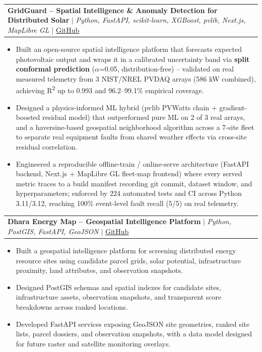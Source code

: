\documentclass[letterpaper,11pt]{article}
\makeatletter
\newcommand{\resumeItem}[1]{
  \item\small{
    {#1 \vspace{-2pt}}
  }
}
\newcommand{\resumeProjectHeading}[2]{
    \item
    \begin{tabular*}{1.001\textwidth}{l@{\extracolsep{\fill}}r}
      \small#1 & \textbf{\small #2}\\
    \end{tabular*}\vspace{-7pt}
}
\newcommand{\resumeItemListStart}{\begin{itemize}}
\newcommand{\resumeItemListEnd}{\end{itemize}\vspace{-5pt}}
\makeatother
\begin{document}
      \resumeProjectHeading
          {\textbf{GridGuard -- Spatial Intelligence \& Anomaly Detection for Distributed Solar} $|$ \emph{Python, FastAPI, scikit-learn, XGBoost, pvlib, Next.js, MapLibre GL} $|$ \href{https://github.com/pranavdamera/gridguard}{\underline{GitHub}}}{}
          \resumeItemListStart
            \resumeItem{Built an open-source spatial intelligence platform that forecasts expected photovoltaic output and wraps it in a calibrated uncertainty band via \textbf{split conformal prediction} ($\alpha$=0.05, distribution-free) -- validated on real measured telemetry from 3 NIST/NREL PVDAQ arrays (586 kW combined), achieving R\textsuperscript{2} up to 0.993 and 96.2--99.1\% empirical coverage.}
            \resumeItem{Designed a physics-informed ML hybrid (pvlib PVWatts chain + gradient-boosted residual model) that outperformed pure ML on 2 of 3 real arrays, and a haversine-based geospatial neighborhood algorithm across a 7-site fleet to separate real equipment faults from shared weather effects via cross-site residual correlation.}
            \resumeItem{Engineered a reproducible offline-train / online-serve architecture (FastAPI backend, Next.js + MapLibre GL fleet-map frontend) where every served metric traces to a build manifest recording git commit, dataset window, and hyperparameters; enforced by 224 automated tests and CI across Python 3.11/3.12, reaching 100\% event-level fault recall (5/5) on real telemetry.}
          \resumeItemListEnd
          \vspace{-13pt}

      \resumeProjectHeading
          {\textbf{Dhara Energy Map -- Geospatial Intelligence Platform} $|$ \emph{Python, PostGIS, FastAPI, GeoJSON} $|$ \href{https://github.com/pranavdamera/dhara-energy-map}{\underline{GitHub}}}{}
          \resumeItemListStart
            \resumeItem{Built a geospatial intelligence platform for screening distributed energy resource sites using candidate parcel grids, solar potential, infrastructure proximity, land attributes, and observation snapshots.}
            \resumeItem{Designed PostGIS schemas and spatial indexes for candidate sites, infrastructure assets, observation snapshots, and transparent score breakdowns across ranked locations.}
            \resumeItem{Developed FastAPI services exposing GeoJSON site geometries, ranked site lists, parcel dossiers, and observation snapshots, with a data model designed for future raster and satellite monitoring overlays.}
          \resumeItemListEnd
\end{document}

